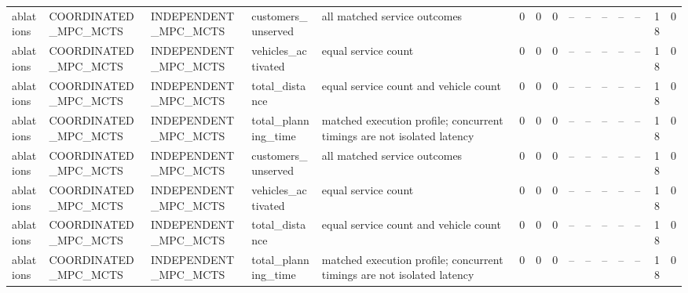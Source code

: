 \begin{table}
{\begin{tabular}{lllllrrrrrrrrrr}
ablations & COORDINATED\_MPC\_MCTS & INDEPENDENT\_MPC\_MCTS & customers\_unserved & all matched service outcomes & 0 & 0 & 0 & -- & -- & -- & -- & -- & 18 & 0 \\
ablations & COORDINATED\_MPC\_MCTS & INDEPENDENT\_MPC\_MCTS & vehicles\_activated & equal service count & 0 & 0 & 0 & -- & -- & -- & -- & -- & 18 & 0 \\
ablations & COORDINATED\_MPC\_MCTS & INDEPENDENT\_MPC\_MCTS & total\_distance & equal service count and vehicle count & 0 & 0 & 0 & -- & -- & -- & -- & -- & 18 & 0 \\
ablations & COORDINATED\_MPC\_MCTS & INDEPENDENT\_MPC\_MCTS & total\_planning\_time & matched execution profile; concurrent timings are not isolated latency & 0 & 0 & 0 & -- & -- & -- & -- & -- & 18 & 0 \\
ablations & COORDINATED\_MPC\_MCTS & INDEPENDENT\_MPC\_MCTS & customers\_unserved & all matched service outcomes & 0 & 0 & 0 & -- & -- & -- & -- & -- & 18 & 0 \\
ablations & COORDINATED\_MPC\_MCTS & INDEPENDENT\_MPC\_MCTS & vehicles\_activated & equal service count & 0 & 0 & 0 & -- & -- & -- & -- & -- & 18 & 0 \\
ablations & COORDINATED\_MPC\_MCTS & INDEPENDENT\_MPC\_MCTS & total\_distance & equal service count and vehicle count & 0 & 0 & 0 & -- & -- & -- & -- & -- & 18 & 0 \\
ablations & COORDINATED\_MPC\_MCTS & INDEPENDENT\_MPC\_MCTS & total\_planning\_time & matched execution profile; concurrent timings are not isolated latency & 0 & 0 & 0 & -- & -- & -- & -- & -- & 18 & 0 \\
\bottomrule
\end{tabular}
}
\end{table}
